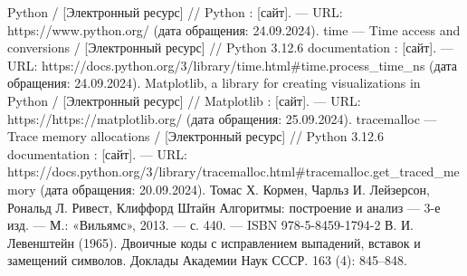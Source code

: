 \begin{thebibliography}{}
	  Python /  [Электронный ресурс] // Python : [сайт]. — URL: https://www.python.org/ (дата обращения: 24.09.2024).
	  time — Time access and conversions /  [Электронный ресурс] // Python 3.12.6 documentation : [сайт]. — URL: https://docs.python.org/3/library/time.html\#time.process\_time\_ns (дата обращения: 24.09.2024).
	  Matplotlib, a library for creating visualizations in Python /  [Электронный ресурс] // Matplotlib : [сайт]. — URL: https://https://matplotlib.org/ (дата обращения: 25.09.2024).
	  tracemalloc — Trace memory allocations /  [Электронный ресурс] // Python 3.12.6 documentation : [сайт]. — URL: https://docs.python.org/3/library/tracemalloc.html\#tracemalloc.get\_traced\_memory (дата обращения: 20.09.2024).
         Томас Х. Кормен, Чарльз И. Лейзерсон, Рональд Л. Ривест, Клиффорд Штайн Алгоритмы: построение и анализ — 3-е изд. — М.: «Вильямс», 2013. — с. 440. — ISBN 978-5-8459-1794-2
         В. И. Левенштейн (1965). Двоичные коды с исправлением выпадений, вставок и замещений символов. Доклады Академии Наук СССР. 163 (4): 845–848.
\end{thebibliography}